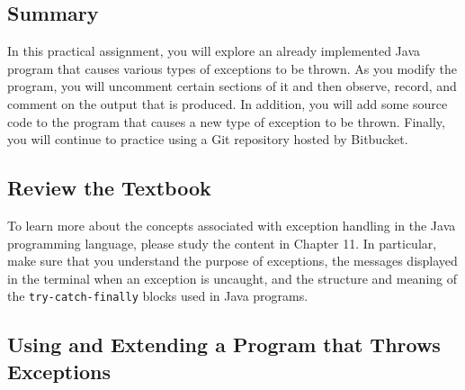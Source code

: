 



\vspace*{-.2in}
\subsection*{Summary}
\vspace*{-.05in}

In this practical assignment, you will explore an already implemented Java program that causes various types of
exceptions to be thrown. As you modify the program, you will uncomment certain sections of it and then observe, record,
and comment on the output that is produced. In addition, you will add some source code to the program that causes a new
type of exception to be thrown. Finally, you will continue to practice using a Git repository hosted by Bitbucket.

\vspace*{-.15in}
\subsection*{Review the Textbook}
\vspace*{-.05in}

To learn more about the concepts associated with exception handling in the Java programming language, please study the
content in Chapter 11. In particular, make sure that you understand the purpose of exceptions, the messages displayed in
the terminal when an exception is uncaught, and the structure and meaning of the {\tt try-catch-finally} blocks used in
Java programs.

\vspace*{-.15in}
\subsection*{Using and Extending a Program that Throws Exceptions}
\vspace*{-.05in}


